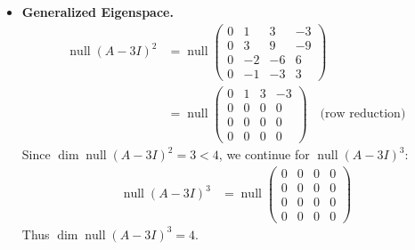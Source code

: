 \documentclass[12pt, letterpaper]{scrartcl}
\DeclareMathOperator{\Null}{null}
\begin{document}
\begin{itemize}
    \begin{align*}
     \left(
     \begin{array}{cccc}
          \cellcolor{lightgray}3&0&0&0\\
          0&\cellcolor{lightgray}3&\cellcolor{lightgray}1&\cellcolor{lightgray}0\\
          0&\cellcolor{lightgray}0&\cellcolor{lightgray}3&\cellcolor{lightgray}1\\
          0&\cellcolor{lightgray}0&\cellcolor{lightgray}0&\cellcolor{lightgray}3
     \end{array}
     \right)
    \text{ or }
    \left(
     \begin{array}{cccc}
          \cellcolor{lightgray}3&\cellcolor{lightgray}1&0&0\\
          \cellcolor{lightgray}0&\cellcolor{lightgray}3&0&0\\
          0&0&\cellcolor{lightgray} 3&\cellcolor{lightgray}1\\
          0&0&\cellcolor{lightgray}0&\cellcolor{lightgray}3
     \end{array}
     \right)
\end{align*}
    \item \textbf{Generalized Eigenspace.}
    \begin{align*}
        \Null(A-3I)^2
        &=
        \Null\left(
        \begin{array}{cccc}
          0&1&3&-3\\
          0&3&9&-9\\
          0&-2&-6&6\\
          0&-1&-3&3
        \end{array}
        \right)\\
        &=
        \Null\left(
        \begin{array}{cccc}
          0&1&3&-3\\
          0&0&0&0\\
          0&0&0&0\\
          0&0&0&0
        \end{array}
        \right) \quad\text{(row reduction)}
    \end{align*}
    Since $\dim\Null(A-3I)^2=3<4$, we continue for $\Null(A-3I)^3$:
    \begin{align*}
        \Null(A-3I)^3
        &=
        \Null\left(
        \begin{array}{cccc}
          0&0&0&0\\
          0&0&0&0\\
          0&0&0&0\\
          0&0&0&0
        \end{array}
        \right)
    \end{align*}
    Thus $\dim\Null(A-3I)^3=4$.



\end{itemize}
\end{document}
